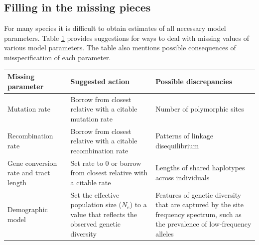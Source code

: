 \documentclass[hidelinks]{article}
\begin{document}
\subsection*{Filling in the missing pieces}

For many species it is difficult to obtain estimates of all necessary model parameters.
Table \ref{tab:param-mod} provides suggestions for ways to deal with missing values of various model parameters.
The table also mentions possible consequences of misspecification of each parameter.

\begin{table}[h!]
	 \label{tab:param-mod}
	\begin{tabular}{p{1.5in}p{2.2in}p{2.2in}}
		\hline
		\textbf{Missing parameter}  & 
		\textbf{Suggested action} & 
		\textbf{Possible discrepancies} \\
		\hline
		Mutation rate      &
		Borrow from closest relative with a citable mutation rate &
		Number of polymorphic sites  \\
		\hline
		Recombination rate &
		Borrow from closest relative with a citable recombination rate &
		Patterns of linkage disequilibrium
		\\
		\hline
		Gene conversion rate and tract length &
		Set rate to 0 or borrow from closest relative with a citable rate &
		Lengths of shared haplotypes across individuals
		\\
		\hline
		Demographic model &
		Set the effective population size ($N_e$) to a value
		that reflects the
		observed genetic diversity %
		     &
		Features of genetic diversity that are captured by the site frequency spectrum,
		such as the prevalence of low-frequency alleles\\
		\hline
	\end{tabular}
\end{table}
\end{document}
